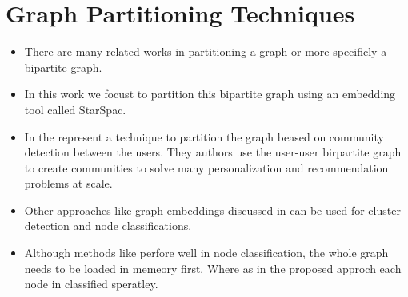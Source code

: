 \section{Graph Partitioning Techniques}
\label{sec:graph-partitioning-techniques}
\begin{itemize}
    \item There are many related works in partitioning a graph or more specificly a bipartite graph.
    \item In this work we focust to partition this bipartite graph using an embedding tool called StarSpac.
    \item In \cite{satuluri2020simclusters} the represent a technique to partition the graph beased on community detection between the users. They authors use the user-user birpartite graph to create communities to solve many personalization and recommendation problems at scale.
    \item Other approaches like graph embeddings discussed in \cite{goyal2018graph} can be used for cluster detection and node classifications.
    \item Although methods like \cite{grover2016node2vec} \cite{wang2016structural} perfore well in node classification, the whole graph needs to be loaded in memeory first. Where as in the proposed approch each node in classified speratley.
\end{itemize}


